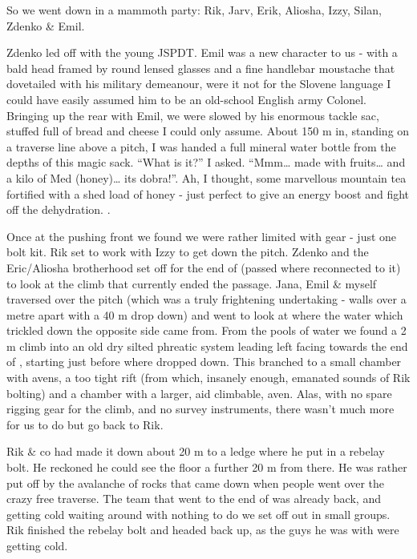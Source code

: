 So we went down in a mammoth party: Rik, Jarv, Erik, Aliosha, Izzy,
Silan, Zdenko \& Emil.

Zdenko led off with the young JSPDT. Emil was a new character to us -
with a bald head framed by round lensed glasses and a fine handlebar
moustache that dovetailed with his military demeanour, were it not for
the Slovene language I could have easily assumed him to be an old-school
English army Colonel. Bringing up the rear with Emil, we were slowed by
his enormous tackle sac, stuffed full of bread and cheese I could only
assume. About 150 m in, standing on a traverse line above a pitch, I was
handed a full mineral water bottle from the depths of this magic sack.
``What is it?'' I asked. ``Mmm\ldots{} made with fruits\ldots{} and a
kilo of Med (honey)\ldots{} its dobra!''. Ah, I thought, some marvellous
mountain tea fortified with a shed load of honey - just perfect to give
an energy boost and fight off the dehydration. .

Once at the pushing front we found we were rather limited with gear -
just one bolt kit. Rik set to work with Izzy to get down the pitch.
Zdenko and the Eric/Aliosha brotherhood set off for the end of 
(passed where  reconnected to it) to look at the climb that
currently ended the passage. Jana, Emil \& myself traversed over the
pitch (which was a truly frightening undertaking - walls over a metre
apart with a 40 m drop down) and went to look at where the water which
trickled down the opposite side came from. From the pools of water we
found a 2 m climb into an old dry silted phreatic system leading left
facing towards the end of , starting just before where 
dropped down. This branched to a small chamber with avens, a too tight
rift (from which, insanely enough, emanated sounds of Rik bolting) and a
chamber with a larger, aid climbable, aven. Alas, with no spare rigging
gear for the climb, and no survey instruments, there wasn't much more
for us to do but go back to Rik.

Rik \& co had made it down about 20 m to a ledge where he put in a
rebelay bolt. He reckoned he could see the floor a further 20 m from
there. He was rather put off by the avalanche of rocks that came down
when people went over the crazy free traverse. The team that went to the
end of  was already back, and getting cold waiting around with
nothing to do we set off out in small groups. Rik finished the rebelay
bolt and headed back up, as the guys he was with were getting cold.

